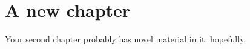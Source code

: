 \documentclass[letterpaper,11pt]{yalephd}
\begin{document}





\mainmatter




\chapter{A new chapter}
Your second chapter probably has novel material in it. hopefully.









\backmatter


\end{document}
